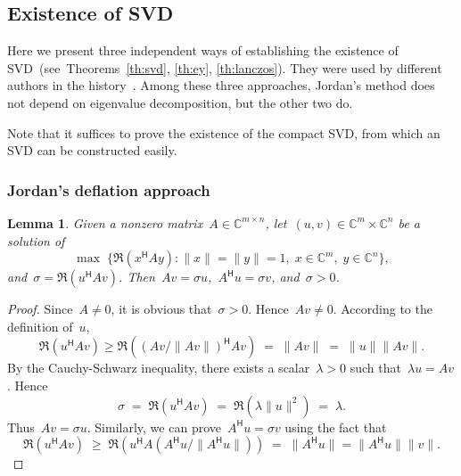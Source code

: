 \documentclass[11pt,a4paper]{article}  %
\numberwithin{equation}{section}
\newtheorem{lemma}{Lemma}%
\theoremstyle{definition}
\def\CC{\mathbb{C}}
\newcommand{\hmt}{{\scriptscriptstyle{{\mathsf{H}}}}}
\begin{document}
\subsection{Existence of SVD}

Here we present three independent ways of establishing the existence of
SVD~(see~Theorems~\ref{th:svd}, \ref{th:ey}, \ref{th:lanczos}).
They were used by different authors in the history~\cite{Stewart_1993}.
Among these three approaches, Jordan's method does not depend on eigenvalue decomposition, but the
other two do.

Note that it suffices to prove the existence of the compact SVD, from which an SVD can be constructed easily.

\subsubsection{Jordan's deflation approach~\cite{Jordan_1874}}

\begin{lemma}
  \label{lem:jordan}
  Given a nonzero matrix~$A\in\CC^{m\times n}$, let~$(u,v)\in \CC^{m}\times \CC^{n}$ be a solution of
  \begin{equation}
    \nonumber
    \max\; \{\Re(x^\hmt A y) \mathrel{:} \|x\|=\|y\|=1, \; x \in \CC^{m}, \; y\in\CC^{n}\},
  \end{equation}
  and~${\sigma} = \Re(u^\hmt Av)$. Then~$Av = \sigma u$,~$A^\hmt u
  = \sigma v$, and~$\sigma>0$.
\end{lemma}

\begin{proof}
  Since~$A\neq 0$, it is obvious that~$\sigma >0$. Hence~$Av \neq 0$. According to the definition
  of~$u$,
  \begin{equation*}
    \Re(u^\hmt Av)\ge \Re(\left({Av}/{\|Av\|}\right)^\hmt Av) \;=\;
    \|Av\|\;=\;\|u\|\|Av\|.
  \end{equation*}
  By the Cauchy-Schwarz inequality, there exists a scalar~$\lambda>0$ such
  that~$\lambda u = Av$. Hence%
  \begin{equation*}
    \sigma \;=\; \Re(u^\hmt Av) \;=\; \Re(\lambda \|u\|^2) \;=\; \lambda.
  \end{equation*}
  Thus~$Av = \sigma u$. Similarly, we can prove~$A^\hmt u = \sigma v$ using the fact that
  \begin{equation*}
    \Re(u^\hmt A v)\;\ge\; \Re(u^\hmt A\left( A^\hmt u/\|A^\hmt
    u\|\right)) \;=\; \|A^\hmt u\| = \|A^\hmt u\|\|v\|.
  \end{equation*}
\end{proof}
\end{document}
